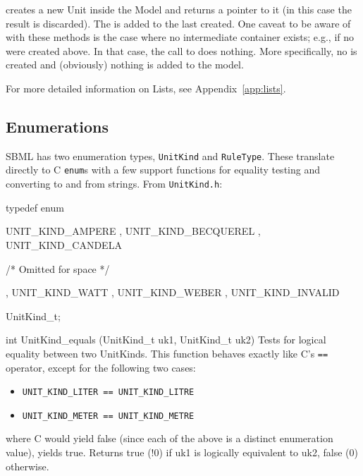 \documentclass{cekmanual}
\begin{document}
 creates a new Unit inside the Model
 and returns a pointer to it (in this case the result is
discarded).  The  is added to the last
 created.  One caveat to be aware of with these
methods is the case where no intermediate container exists; e.g., if
no  were created above.  In that case, the call
to  does nothing.  More specifically, no
 is created and (obviously) nothing is added to the model.

For more detailed information on Lists, see Appendix~\ref{app:lists}.


\subsection{Enumerations}
\label{sec:enumerations}

SBML has two enumeration types, \texttt{UnitKind} and
\texttt{RuleType}.  These translate directly to C \texttt{enum}s with a
few support functions for equality testing and converting to and from
strings.  From \texttt{UnitKind.h}:


\begin{example}[c]
typedef enum
{
    UNIT_KIND_AMPERE
  , UNIT_KIND_BECQUEREL
  , UNIT_KIND_CANDELA

   /* Omitted for space */

  , UNIT_KIND_WATT
  , UNIT_KIND_WEBER
  , UNIT_KIND_INVALID
} UnitKind_t;
\end{example}


\begin{methoddef}{int UnitKind\_equals (UnitKind\_t uk1, UnitKind\_t uk2)}
  Tests for logical equality between two UnitKinds.  This function behaves
  exactly like C's \texttt{==} operator, except for the following two cases:

\begin{itemize}
  \item \texttt{UNIT\_KIND\_LITER == UNIT\_KIND\_LITRE}
  \item \texttt{UNIT\_KIND\_METER == UNIT\_KIND\_METRE}
\end{itemize}

  where C would yield false (since each of the above is a distinct
  enumeration value),  yields true.
  Returns true (!0) if uk1 is logically equivalent to uk2, false (0)
  otherwise.
\end{methoddef}
  
\end{document}
